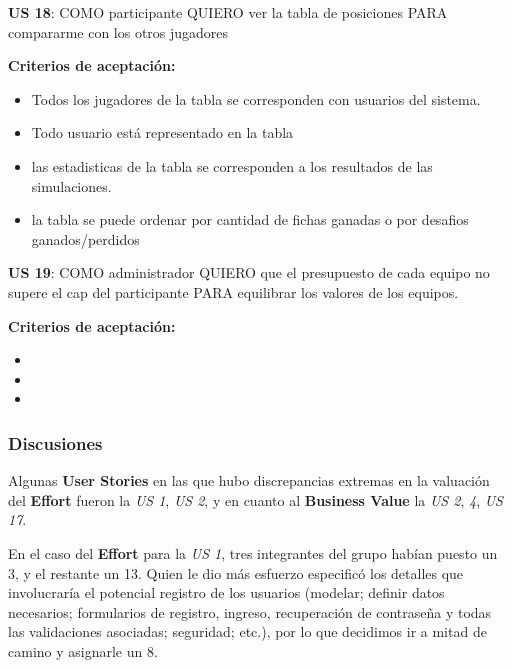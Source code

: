 \begin{tcolorbox}
\textbf{US 18}: COMO participante QUIERO ver la tabla de posiciones PARA compararme con los otros jugadores

\vline

\textbf{Criterios de aceptación:}
\begin{itemize}
\item Todos los jugadores de la tabla se corresponden con usuarios del sistema.
\item Todo usuario está representado en la tabla
\item las estadisticas de la tabla se corresponden a los resultados de las simulaciones.
\item la tabla se puede ordenar por cantidad de fichas ganadas o por desafios ganados/perdidos
\end{itemize}
\end{tcolorbox}
\vspace{10pt}

\begin{tcolorbox}
\textbf{US 19}: COMO administrador QUIERO que el presupuesto de cada equipo no supere el cap del participante PARA equilibrar los valores de los equipos.

\vline

\textbf{Criterios de aceptación:}
\begin{itemize}
\item %
\item %
\item %
\end{itemize}
\end{tcolorbox}
\vspace{10pt}


\subsubsection*{Discusiones}
Algunas \textbf{User Stories} en las que hubo discrepancias extremas en la valuación del \textbf{Effort} fueron la \emph{US 1}, \emph{US 2}, y en cuanto al \textbf{Business Value} la \emph{US 2}, \emph{4}, \emph{US 17}.

En el caso del \textbf{Effort} para la \emph{US 1}, tres integrantes del grupo habían puesto un 3, y el restante un 13. Quien le dio más esfuerzo especificó los detalles que involucraría el potencial registro de los usuarios (modelar; definir datos necesarios; formularios de registro, ingreso, recuperación de contraseña y todas las validaciones asociadas; seguridad; etc.), por lo que decidimos ir a mitad de camino y asignarle un 8.

